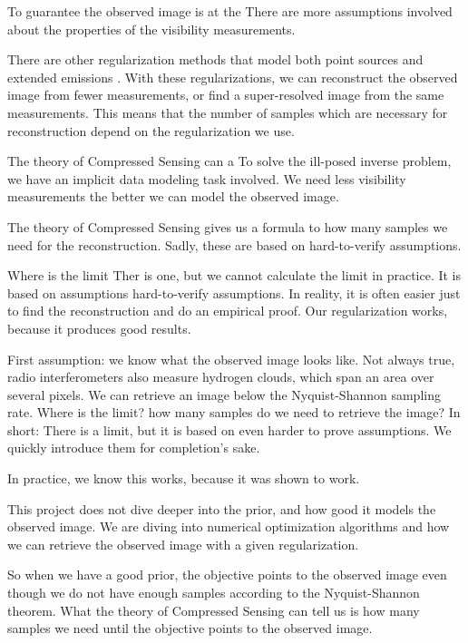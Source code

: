 To guarantee the observed image is at the There are more assumptions involved about the properties of the visibility measurements. 

There are other regularization methods that model both point sources and extended emissions \cite{starck2003astronomical, starck2015starlet}. With these regularizations, we can reconstruct the observed image from fewer measurements, or find a super-resolved image from the same measurements. This means that the number of samples which are necessary for reconstruction depend on the regularization we use.

The theory of Compressed Sensing can a
To solve the ill-posed inverse problem, we have an implicit data modeling task involved. We need less visibility measurements the better we can model the observed image.

The theory of Compressed Sensing gives us a formula to how many samples we need for the reconstruction. Sadly, these are based on hard-to-verify assumptions. 

Where is the limit
Ther is one, but we cannot calculate the limit in practice. It is based on assumptions hard-to-verify assumptions. In reality, it is often easier just to find the reconstruction and do an empirical proof. Our regularization works, because it produces good results.



First assumption: we know what the observed image looks like. Not always true, radio interferometers also measure hydrogen clouds, which span an area over several pixels.
We can retrieve an image below the Nyquist-Shannon sampling rate. Where is the limit? how many samples do we need to retrieve the image? In short: There is a limit, but it is based on even harder to prove assumptions. We quickly introduce them for completion's sake.

In practice, we know this works, because it was shown to work.

This project does not dive deeper into the prior, and how good it models the observed image. We are diving into numerical optimization algorithms and how we can retrieve the observed image with a given regularization.




So when we have a good prior, the objective points to the observed image even though we do not have enough samples according to the Nyquist-Shannon theorem. What the theory of Compressed Sensing can tell us is how many samples we need until the objective points to the observed image.

